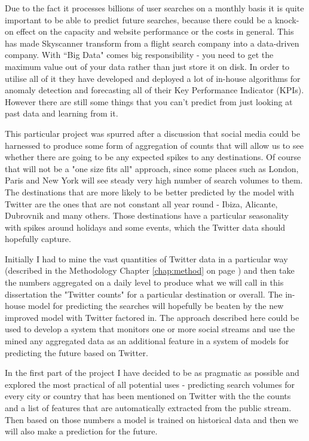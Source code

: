 \documentclass[minf,twoside,singlespacing,parskip,frontabs]{infthesis}
\begin{document}
Due to the fact it processes billions of user searches on a monthly basis it is quite important to be able to predict future searches, because there could be a knock-on effect on the capacity and website performance or the costs in general. This has made Skyscanner transform from a flight search company into a data-driven company. With ``Big Data" comes big responsibility - you need to get the maximum value out of your data rather than just store it on disk. In order to utilise all of it they have developed and deployed a lot of in-house algorithms for anomaly detection and forecasting all of their Key Performance Indicator (KPIs). However there are still some things that you can't predict from just looking at past data and learning from it.


This particular project was spurred after a discussion that social media could be harnessed to produce some form of aggregation of counts that will allow us to see whether there are going to be any expected spikes to any destinations. Of course that will not be a "one size fits all" approach, since some places such as London, Paris and New York will see steady very high number of search volumes to them. The destinations that are more likely to be better predicted by the model with Twitter are the ones that are not constant all year round - Ibiza, Alicante, Dubrovnik and many others. Those destinations have a particular seasonality with spikes around holidays and some events, which the Twitter data should hopefully capture.


Initially I had to mine the vast quantities of Twitter data in a particular way (described in the Methodology Chapter \ref{chap:method} on page \pageref{chap:method}) and then take the numbers aggregated on a daily level to produce what we will call in this dissertation the "Twitter counts" for a particular destination or overall. The in-house model for predicting the searches will hopefully be beaten by the new improved model with Twitter factored in. The approach described here could be used to develop a system that monitors one or more social streams and use the mined any aggregated data as an additional feature in a system of models for predicting the future based on Twitter.


In the first part of the project I have decided to be as pragmatic as possible and explored the most practical of all potential uses - predicting search volumes for every city or country that has been mentioned on Twitter with the the counts and a list of features that are automatically extracted from the public stream. Then based on those numbers a model is trained on historical data and then we will also make a prediction for the future. 
\end{document}

